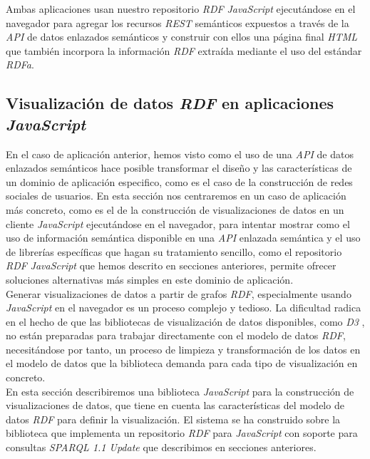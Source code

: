 Ambas aplicaciones usan nuestro repositorio \textit{RDF} \textit{JavaScript} ejecut\'andose en el navegador para agregar los recursos \textit{REST} sem\'anticos expuestos a trav\'es de la \textit{API} de datos enlazados sem\'anticos y construir con ellos una p\'agina final \textit{HTML} que tambi\'en incorpora la informaci\'on \textit{RDF} extra\'ida mediante el uso del est\'andar \textit{RDFa}.

\subsection{Visualizaci\'on de datos \textit{RDF} en aplicaciones \textit{JavaScript}}

En el caso de aplicaci\'on anterior, hemos visto como el uso de una \textit{API} de datos enlazados sem\'anticos hace posible transformar el dise\~no y las caracter\'isticas de un dominio de aplicaci\'on especifico, como es el caso de la construcci\'on de redes sociales de usuarios. En esta secci\'on nos centraremos en un caso de aplicaci\'on m\'as concreto, como es el de la construcci\'on de visualizaciones de datos en un cliente \textit{JavaScript} ejecut\'andose en el navegador, para intentar mostrar como el uso de informaci\'on sem\'antica disponible en una \textit{API} enlazada sem\'antica y el uso de librer\'ias espec\'ificas que hagan su tratamiento sencillo, como el repositorio \textit{RDF} \textit{JavaScript} que hemos descrito en secciones anteriores, permite ofrecer soluciones alternativas m\'as simples en este dominio de aplicaci\'on.\\
Generar visualizaciones de datos a partir de grafos \textit{RDF}, especialmente usando \textit{JavaScript} en el navegador es un proceso complejo y tedioso. La dificultad radica en el hecho de que las bibliotecas de visualizaci\'on de datos disponibles, como \textit{D3} \cite{d3}, no est\'an preparadas para trabajar directamente con el modelo de datos \textit{RDF}, necesit\'andose por tanto, un proceso de limpieza y transformaci\'on de los datos en el modelo de datos que la biblioteca demanda para cada tipo de visualizaci\'on en concreto.\\
En esta secci\'on describiremos una biblioteca \textit{JavaScript} para la construcci\'on de visualizaciones de datos, que tiene en cuenta las caracter\'isticas del modelo de datos \textit{RDF} para definir la visualizaci\'on. El sistema se ha construido sobre la biblioteca que implementa un repositorio \textit{RDF} para \textit{JavaScript} con soporte para consultas \textit{SPARQL 1.1 Update} que describimos en secciones anteriores.

